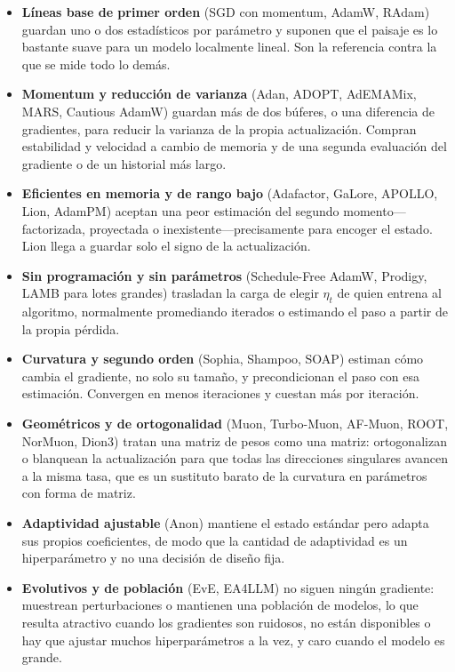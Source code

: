 \begin{itemize}[leftmargin=*]
\item \textbf{Líneas base de primer orden} (SGD con momentum, AdamW, RAdam)
guardan uno o dos estadísticos por parámetro y suponen que el paisaje es lo
bastante suave para un modelo localmente lineal. Son la referencia contra la que
se mide todo lo demás.
\item \textbf{Momentum y reducción de varianza} (Adan, ADOPT, AdEMAMix, MARS,
Cautious AdamW) guardan más de dos búferes, o una diferencia de gradientes, para
reducir la varianza de la propia actualización. Compran estabilidad y velocidad a
cambio de memoria y de una segunda evaluación del gradiente o de un historial más
largo.
\item \textbf{Eficientes en memoria y de rango bajo} (Adafactor, GaLore, APOLLO,
Lion, AdamPM) aceptan una peor estimación del segundo momento---factorizada,
proyectada o inexistente---precisamente para encoger el estado. Lion llega a
guardar solo el signo de la actualización.
\item \textbf{Sin programación y sin parámetros} (Schedule-Free AdamW, Prodigy,
LAMB para lotes grandes) trasladan la carga de elegir $\eta_t$ de quien entrena
al algoritmo, normalmente promediando iterados o estimando el paso a partir de la
propia pérdida.
\item \textbf{Curvatura y segundo orden} (Sophia, Shampoo, SOAP) estiman cómo
cambia el gradiente, no solo su tamaño, y precondicionan el paso con esa
estimación. Convergen en menos iteraciones y cuestan más por iteración.
\item \textbf{Geométricos y de ortogonalidad} (Muon, Turbo-Muon, AF-Muon, ROOT,
NorMuon, Dion3) tratan una matriz de pesos como una matriz: ortogonalizan o
blanquean la actualización para que todas las direcciones singulares avancen a la
misma tasa, que es un sustituto barato de la curvatura en parámetros con forma de
matriz.
\item \textbf{Adaptividad ajustable} (Anon) mantiene el estado estándar pero
adapta sus propios coeficientes, de modo que la cantidad de adaptividad es un
hiperparámetro y no una decisión de diseño fija.
\item \textbf{Evolutivos y de población} (EvE, EA4LLM) no siguen ningún gradiente:
muestrean perturbaciones o mantienen una población de modelos, lo que resulta
atractivo cuando los gradientes son ruidosos, no están disponibles o hay que
ajustar muchos hiperparámetros a la vez, y caro cuando el modelo es grande.
\end{itemize}

